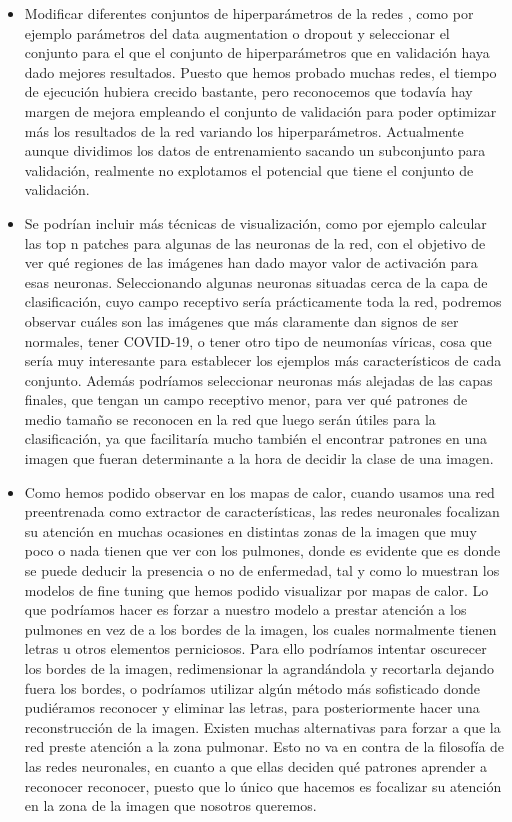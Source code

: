 \documentclass[11pt,a4paper]{article}
\theoremstyle{definition}
\begin{document}
\begin{itemize}
\item Modificar diferentes conjuntos de hiperparámetros de la redes , como por ejemplo parámetros del data augmentation o dropout y seleccionar el conjunto para el que el conjunto de hiperparámetros que en validación haya dado mejores resultados.  Puesto que hemos probado muchas redes, el tiempo de ejecución hubiera crecido bastante, pero reconocemos que todavía hay margen de mejora empleando el conjunto de validación para poder optimizar más los resultados de la red variando los hiperparámetros. Actualmente aunque dividimos los datos de entrenamiento sacando un subconjunto para validación, realmente no explotamos el potencial que tiene el conjunto de validación.
\item Se podrían incluir más técnicas de visualización, como por ejemplo calcular las top n patches para algunas de las neuronas de la red, con el objetivo de ver qué regiones de las imágenes han dado mayor valor de activación para esas neuronas. Seleccionando algunas neuronas situadas cerca de la capa de clasificación, cuyo campo receptivo sería prácticamente toda la red, podremos observar cuáles son las imágenes que más claramente dan signos de ser normales, tener COVID-19, o tener otro tipo de neumonías víricas, cosa que sería muy interesante para establecer los ejemplos más característicos de cada conjunto. Además podríamos seleccionar neuronas más alejadas de las capas finales, que tengan un campo receptivo menor, para ver qué patrones de medio tamaño se reconocen en la red que luego serán útiles para la clasificación, ya que facilitaría mucho también el encontrar patrones en una imagen que fueran determinante a la hora de decidir la clase de una imagen.
\item Como hemos podido observar en los mapas de calor, cuando usamos una red preentrenada como extractor de características,  las redes neuronales focalizan su atención en muchas ocasiones en distintas zonas de la imagen que muy poco o nada tienen que ver con los pulmones, donde es evidente que es donde se puede deducir la presencia o no de enfermedad,  tal y como lo muestran los modelos de fine tuning que hemos podido visualizar por mapas de calor.  Lo que podríamos hacer es forzar a nuestro modelo a prestar atención a los pulmones en vez de a los bordes de la imagen, los cuales normalmente tienen letras u otros elementos perniciosos. Para ello podríamos intentar oscurecer los bordes de la imagen,  redimensionar la agrandándola y recortarla dejando fuera los bordes, o podríamos utilizar algún método más sofisticado donde pudiéramos reconocer y eliminar las letras, para posteriormente hacer una reconstrucción de la imagen.  Existen muchas alternativas para forzar a que la red preste atención a la zona pulmonar. Esto no va en contra de la filosofía de las redes neuronales, en cuanto a que ellas deciden qué patrones aprender a reconocer reconocer, puesto que lo único que hacemos es focalizar su atención en la zona de la imagen que nosotros queremos.
\end{itemize}

\cleardoublepage




\end{document}
